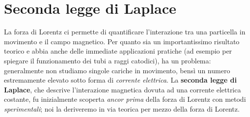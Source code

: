\section{Seconda legge di Laplace}
La forza di Lorentz ci permette di quantificare l'interazione tra una particella in movimento e il campo magnetico. Per quanto sia un importantissimo risultato teorico e abbia anche delle immediate applicazioni pratiche (ad esempio per spiegare il funzionamento dei tubi a raggi catodici), ha un problema: generalmente non studiamo singole cariche in movimento, bensì un numero estremamente elevato sotto forma di \textit{corrente elettrica}. La \textbf{seconda legge di Laplace}, che descrive l'interazione magnetica dovuta ad una corrente elettrica costante, fu inizialmente scoperta \textit{ancor prima} della forza di Lorentz con metodi \textit{sperimentali}; noi la deriveremo in via teorica per mezzo della forza di Lorentz.

